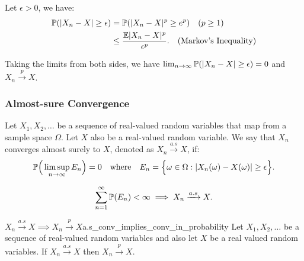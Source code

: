\begin{proof*}
    Let $\epsilon>0$, we have:
    \begin{align*}
        \mathbb{P}(|X_n - X| \ge \epsilon) &= \mathbb{P}(|X_n - X|^p \ge e^p) \quad (p\ge 1) \\
            &\le \frac{\mathbb{E}|X_n - X|^p}{\epsilon^p}. \quad (\text{Markov's Inequality})
    \end{align*}

    \noindent Taking the limits from both sides, we have $\lim_{n\to\infty}\mathbb{P}(|X_n-X|\ge \epsilon) = 0$ and $X_n\xrightarrow{p}X$.
\end{proof*}

\subsubsection{Almost-sure Convergence}
\begin{definition}
    Let $X_1, X_2, \dots$ be a sequence of real-valued random variables that map from a sample space $\Omega$. Let $X$ also be a real-valued random variable. We say that $X_n$ converges almost surely to $X$, denoted as $X_n\xrightarrow{a.s}X$, if:
    \begin{align*}
        \mathbb{P}\Big( 
            \limsup_{n\to\infty} E_n
         \Big) = 0 \quad \text{where} \quad E_n = \Big\{ 
            \omega\in\Omega: |X_n(\omega) - X(\omega)| \ge \epsilon
         \Big\}.
    \end{align*} 
\end{definition}

\begin{remark}
    \begin{equation}
        \sum_{n=1}^\infty \mathbb{P}(E_n) < \infty \implies X_n\xrightarrow{a.s} X.
    \end{equation}
\end{remark}

\begin{proposition}{$X_n\xrightarrow{a.s}X\implies X_n\xrightarrow{p}X$}{a.s_conv_implies_conv_in_probability}
    Let $X_1, X_2,\dots$ be a sequence of real-valued random variables and also let $X$ be a real valued random variables. If $X_n\xrightarrow{a.s}X$ then $X_n\xrightarrow{p}X$.    
\end{proposition}

